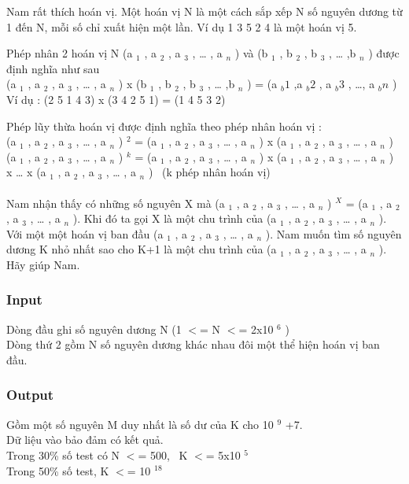 

Nam rất thích hoán vị. Một hoán vị N là một cách sắp xếp N số nguyên dương từ 1 đến N, mỗi số chỉ xuất hiện một lần. Ví dụ 1 3 5 2 4 là một hoán vị 5.

Phép nhân 2 hoán vị N (a $_ 1 $ , a $_ 2 $ , a $_ 3 $ , … , a $_ n $ ) và (b $_ 1 $ , b $_ 2 $ , b $_ 3 $ , … ,b $_ n $ ) được định nghĩa như sau
\\(a $_ 1 $ , a $_ 2 $ , a $_ 3 $ , … , a $_ n $ ) x (b $_ 1 $ , b $_ 2 $ , b $_ 3 $ , … ,b $_ n $ ) = (a $_ b1 $ ,a $_ b2 $ , a $_ b3 $ , …, a $_ bn $ )
\\Ví dụ : (2 5 1 4 3) x (3 4 2 5 1) = (1 4 5 3 2)

Phép lũy thừa hoán vị được định nghĩa theo phép nhân hoán vị :
\\(a $_ 1 $ , a $_ 2 $ , a $_ 3 $ , … , a $_ n $ ) $^ 2 $ = (a $_ 1 $ , a $_ 2 $ , a $_ 3 $ , … , a $_ n $ ) x (a $_ 1 $ , a $_ 2 $ , a $_ 3 $ , … , a $_ n $ )
\\(a $_ 1 $ , a $_ 2 $ , a $_ 3 $ , … , a $_ n $ ) $^ k $ = (a $_ 1 $ , a $_ 2 $ , a $_ 3 $ , … , a $_ n $ ) x (a $_ 1 $ , a $_ 2 $ , a $_ 3 $ , … , a $_ n $ ) x … x (a $_ 1 $ , a $_ 2 $ , a $_ 3 $ , … , a $_ n $ )  (k phép nhân hoán vị)
\\
\\Nam nhận thấy có những số nguyên X mà (a $_ 1 $ , a $_ 2 $ , a $_ 3 $ , … , a $_ n $ ) $^ X $ = (a $_ 1 $ , a $_ 2 $ , a $_ 3 $ , … , a $_ n $ ). Khi đó ta gọi X là một chu trình của (a $_ 1 $ , a $_ 2 $ , a $_ 3 $ , … , a $_ n $ ).
\\Với một một hoán vị ban đầu (a $_ 1 $ , a $_ 2 $ , a $_ 3 $ , … , a $_ n $ ). Nam muốn tìm số nguyên dương K nhỏ nhất sao cho K+1 là một chu trình của (a $_ 1 $ , a $_ 2 $ , a $_ 3 $ , … , a $_ n $ ). Hãy giúp Nam.

\subsubsection{Input}

Dòng đầu ghi số nguyên dương N (1 $<$= N $<$= 2x10 $^ 6 $ )
\\Dòng thứ 2 gồm N số nguyên dương khác nhau đôi một thể hiện hoán vị ban đầu.

\subsubsection{Output}

Gồm một số nguyên M duy nhất là số dư của K cho 10 $^ 9 $ +7.
\\Dữ liệu vào bảo đảm có kết quả.
\\Trong 30\% số test có N $<$= 500,  K $<$= 5x10 $^ 5 $
\\Trong 50\% số test, K $<$= 10 $^ 18 $

